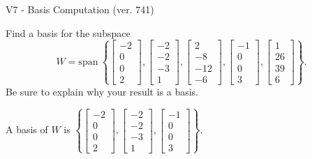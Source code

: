 \begin{exercise}
  \begin{exerciseTitle}V7 - Basis Computation (ver. 741)\end{exerciseTitle}
  \begin{exerciseStatement}
    Find a basis for the subspace 
\[W=\mathrm{span}\ \left\{\left[\begin{array}{r}
-2 \\
0 \\
0 \\
2
\end{array}\right] , \left[\begin{array}{r}
-2 \\
-2 \\
-3 \\
1
\end{array}\right] , \left[\begin{array}{r}
2 \\
-8 \\
-12 \\
-6
\end{array}\right] , \left[\begin{array}{r}
-1 \\
0 \\
0 \\
3
\end{array}\right] , \left[\begin{array}{r}
1 \\
26 \\
39 \\
6
\end{array}\right]\right\}.\]
 Be sure to explain why your result is a basis.


  \end{exerciseStatement}
  \begin{exerciseAnswer}
   A basis of \(W\) is  \(\left\{\left[\begin{array}{r}
-2 \\
0 \\
0 \\
2
\end{array}\right] , \left[\begin{array}{r}
-2 \\
-2 \\
-3 \\
1
\end{array}\right] , \left[\begin{array}{r}
-1 \\
0 \\
0 \\
3
\end{array}\right]\right\}\).
  


  \end{exerciseAnswer}
\end{exercise}